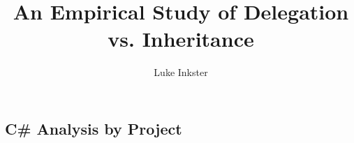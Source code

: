 \documentclass[11pt
              , a4paper
              , twoside
              , openright
              ]{report}
\title{An Empirical Study of Delegation vs. Inheritance}
\author{Luke Inkster}
\date{}
\begin{document}
\frontmatter



\maketitle

%

\tableofcontents


\mainmatter






%



\backmatter


%



\begin{appendices}
\chapter{C\# Analysis by Project}
\label{A:csProjStats} 

%
\end{appendices}
\end{document}
